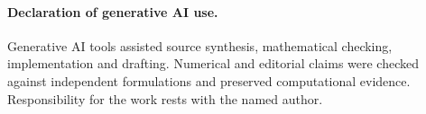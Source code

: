 \paragraph{Declaration of generative AI use.}
Generative AI tools assisted source synthesis, mathematical checking,
implementation and drafting. Numerical and editorial claims were checked
against independent formulations and preserved computational evidence.
Responsibility for the work rests with the named author.

